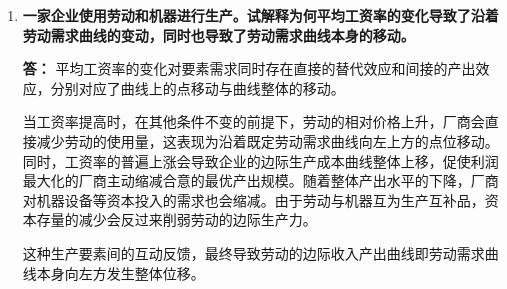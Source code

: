 \begin{enumerate}[label=\textbf{\arabic*.}, leftmargin=*]
		因此，该厂商应当缩减工人的雇用数量并削减甜饼产量，通过提升劳动边际产量的方式，使边际收入产出向边际成本靠拢以实现利润最大化。
		\newpage
		\item \textbf{一家企业使用劳动和机器进行生产。试解释为何平均工资率的变化导致了沿着劳动需求曲线的变动，同时也导致了劳动需求曲线本身的移动。}
		
		\textbf{答：}
		平均工资率的变化对要素需求同时存在直接的替代效应和间接的产出效应，分别对应了曲线上的点移动与曲线整体的移动。
		
		当工资率提高时，在其他条件不变的前提下，劳动的相对价格上升，厂商会直接减少劳动的使用量，这表现为沿着既定劳动需求曲线向左上方的点位移动。同时，工资率的普遍上涨会导致企业的边际生产成本曲线整体上移，促使利润最大化的厂商主动缩减合意的最优产出规模。随着整体产出水平的下降，厂商对机器设备等资本投入的需求也会缩减。由于劳动与机器互为生产互补品，资本存量的减少会反过来削弱劳动的边际生产力。
		
		这种生产要素间的互动反馈，最终导致劳动的边际收入产出曲线即劳动需求曲线本身向左方发生整体位移。
		
	\end{enumerate}
	\newpage
